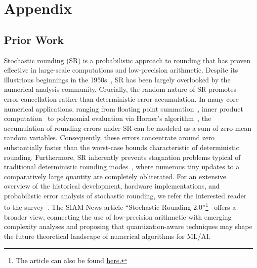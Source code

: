 \documentclass{article}
\begin{document}
\newpage




\newpage
\appendix

\section{Appendix}

\subsection{Prior Work}\label{sxn:priorwork}

Stochastic rounding (SR) is a probabilistic approach to rounding that has proven effective in large-scale computations and low-precision arithmetic. Despite its illustrious beginnings in the 1950s~\citep{vonneumann1947numerical,green1950november,forsythe1959rounding}, SR has been largely overlooked by the numerical analysis community. Crucially, the random nature of SR promotes error cancellation rather than deterministic error accumulation. In many core numerical applications, ranging from floating point summation~\citep{hallman2023precision,de2025error}, inner product computation~\citep{ipsen2020probabilistic,el2023stochastic} to polynomial evaluation via Horner's algorithm~\citep{el2023stochastic}, the accumulation of rounding errors under SR can be modeled as a sum of zero-mean random variables. Consequently, these errors concentrate around zero substantially faster than the worst-case bounds characteristic of deterministic rounding. Furthermore, SR inherently prevents stagnation problems typical of traditional deterministic rounding modes~\citep{connolly2021stochastic,croci2023effects}, where numerous tiny updates to a comparatively large quantity are completely obliterated. 
%
%
For an extensive overview of the historical development, hardware implementations, and probabilistic error analysis of stochastic rounding, we refer the interested reader to the survey~\citep{croci2022stochastic}. The SIAM News article “Stochastic Rounding 2.0”\footnote{The article can also be found \href{https://www.siam.org/publications/siam-news/articles/stochastic-rounding-20-with-a-view-towards-complexity-analysis/}{here.}}~\citep{drineas2024stochastic} offers a broader view, connecting the use of low-precision arithmetic with emerging complexity analyses and proposing that quantization-aware techniques may shape the future theoretical landscape of numerical algorithms for ML/AI.
\end{document}
